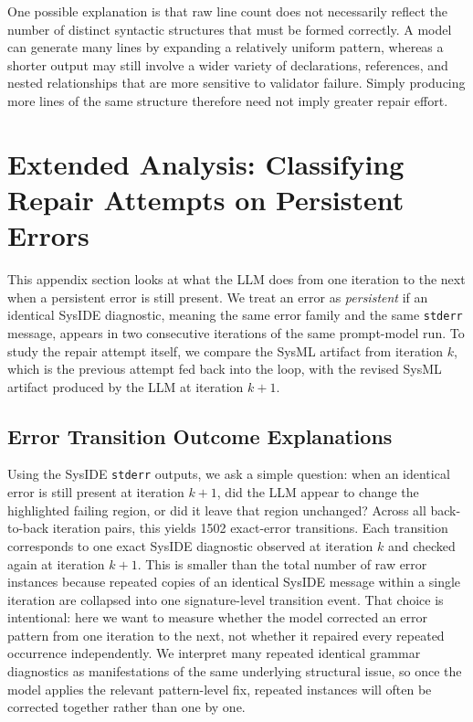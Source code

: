 \documentclass[11pt]{article}
\begin{document}
One possible explanation is that raw line count does not necessarily reflect the number of distinct syntactic structures that must be formed correctly. A model can generate many lines by expanding a relatively uniform pattern, whereas a shorter output may still involve a wider variety of declarations, references, and nested relationships that are more sensitive to validator failure. Simply producing more lines of the same structure therefore need not imply greater repair effort.

\section{Extended Analysis: Classifying Repair Attempts on Persistent Errors}
This appendix section looks at what the LLM does from one iteration to the next when a persistent error is still present. We treat an error as \emph{persistent} if an identical SysIDE diagnostic, meaning the same error family and the same \texttt{stderr} message, appears in two consecutive iterations of the same prompt-model run. To study the repair attempt itself, we compare the SysML artifact from iteration \(k\), which is the previous attempt fed back into the loop, with the revised SysML artifact produced by the LLM at iteration \(k+1\).

\subsection{Error Transition Outcome Explanations}
Using the SysIDE \texttt{stderr} outputs, we ask a simple question: when an identical error is still present at iteration \(k+1\), did the LLM appear to change the highlighted failing region, or did it leave that region unchanged? Across all back-to-back iteration pairs, this yields 1502 exact-error transitions. Each transition corresponds to one exact SysIDE diagnostic observed at iteration \(k\) and checked again at iteration \(k+1\). This is smaller than the total number of raw error instances because repeated copies of an identical SysIDE message within a single iteration are collapsed into one signature-level transition event. That choice is intentional: here we want to measure whether the model corrected an error pattern from one iteration to the next, not whether it repaired every repeated occurrence independently. We interpret many repeated identical grammar diagnostics as manifestations of the same underlying structural issue, so once the model applies the relevant pattern-level fix, repeated instances will often be corrected together rather than one by one.
\end{document}
